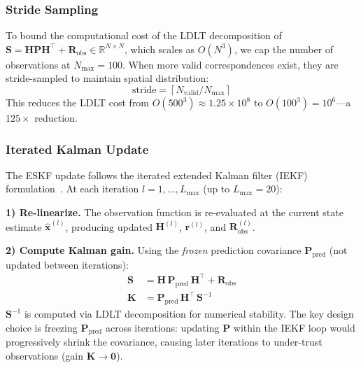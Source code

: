 \subsubsection{Stride Sampling}
\label{sec:stride}

To bound the computational cost of the LDLT decomposition of $\mathbf{S} = \mathbf{H}\mathbf{P}\mathbf{H}^\top + \mathbf{R}_\text{obs} \in \mathbb{R}^{N \times N}$, which scales as $O(N^3)$, we cap the number of observations at $N_\text{max} = 100$.
When more valid correspondences exist, they are stride-sampled to maintain spatial distribution:
\begin{equation}
    \text{stride} = \left\lceil N_\text{valid} / N_\text{max} \right\rceil
    \label{eq:stride}
\end{equation}
This reduces the LDLT cost from $O(500^3) \approx 1.25 \times 10^8$ to $O(100^3) = 10^6$---a $125\times$ reduction.

\subsubsection{Iterated Kalman Update}
\label{sec:iekf}

The ESKF update follows the iterated extended Kalman filter (IEKF) formulation~\cite{xu2022fastlio2,sola2017quaternion}.
At each iteration $l = 1, \ldots, L_\text{max}$ (up to $L_\text{max} = 20$):

\textbf{1) Re-linearize.}
The observation function is re-evaluated at the current state estimate $\hat{\mathbf{x}}^{(l)}$, producing updated $\mathbf{H}^{(l)}$, $\mathbf{r}^{(l)}$, and $\mathbf{R}_\text{obs}^{(l)}$.

\textbf{2) Compute Kalman gain.}
Using the \emph{frozen} prediction covariance $\mathbf{P}_\text{pred}$ (not updated between iterations):
\begin{align}
    \mathbf{S} &= \mathbf{H}\,\mathbf{P}_\text{pred}\,\mathbf{H}^\top + \mathbf{R}_\text{obs} \label{eq:innovation_cov} \\
    \mathbf{K} &= \mathbf{P}_\text{pred}\,\mathbf{H}^\top\,\mathbf{S}^{-1} \label{eq:kalman_gain}
\end{align}
$\mathbf{S}^{-1}$ is computed via LDLT decomposition for numerical stability.
The key design choice is freezing $\mathbf{P}_\text{pred}$ across iterations: updating $\mathbf{P}$ within the IEKF loop would progressively shrink the covariance, causing later iterations to under-trust observations (gain $\mathbf{K} \to \mathbf{0}$).

